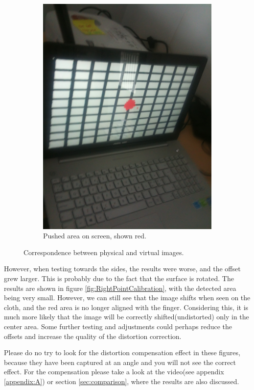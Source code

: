 \documentclass[]{article}
\begin{document}
\begin{figure}[!hbtp]
\begin{subfigure}{.5\textwidth}
  \includegraphics[width=0.9\linewidth]{figures/RedCenterDot.JPG}
  \caption{Pushed area on screen, shown red.}
  \label{fig:RedCenterDot}
\end{subfigure}
\caption{Correspondence between physical and virtual images.}
\label{fig:CenterPointCalibration}
\end{figure}

However, when testing towards the sides, the results were worse, and the offset grew larger. This is probably due to the fact that the surface is rotated. The results are shown in figure \ref{fig:RightPointCalibration}, with the detected area being very small. However, we can still see that the image shifts when seen on the cloth, and the red area is no longer aligned with the finger. Considering this, it is much more likely that the image will be correctly shifted(undistorted) only in the center area. Some further testing and adjustments could perhaps reduce the offsets and increase the quality of the distortion correction.

Please do no try to look for the distortion compensation effect in these figures, because they have been captured at an angle and you will not see the correct effect. For the compensation please take a look at  the video(see appendix \ref{appendix:A}) or section \ref{sec:comparison}, where the results are also discussed.
\end{document}
